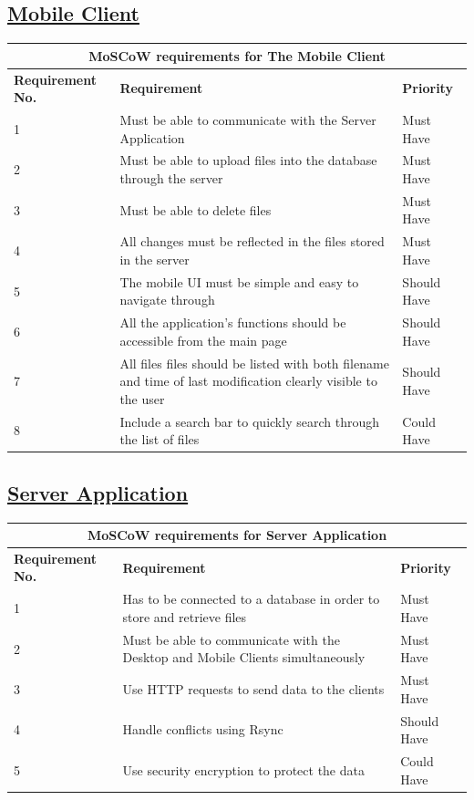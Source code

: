 \documentclass{article}
\begin{document}
\subsection{\underline{Mobile Client}}
\begin{tabular}{|p{3cm}|p{5cm}|p{4cm}|}
\hline
\multicolumn{3}{|c|}{\textbf{MoSCoW requirements for The Mobile Client}} \\
\hline
\textbf{Requirement No.} & \textbf{Requirement} & \textbf{Priority}\\
\hline
1 & Must be able to communicate with the Server Application & Must Have \\
\hline
2 & Must be able to upload files into the database through the server & Must Have \\
\hline
3 & Must be able to delete files & Must Have \\
\hline
4 & All changes must be reflected in the files stored in the server & Must Have \\
\hline
5 & The mobile UI must be simple and easy to navigate through & Should Have \\
\hline
6 & All the application's functions should be accessible from the main page & Should Have \\
\hline
7 & All files files should be listed with both filename and time of last modification clearly visible to the user & Should Have \\
\hline
8 & Include a search bar to quickly search through the list of files & Could Have \\
\hline
\end{tabular}

\subsection{\underline{Server Application}}

\begin{tabular}{|p{3cm}|p{5cm}|p{4cm}|}
\hline
\multicolumn{3}{|c|}{\textbf{MoSCoW requirements for Server Application}} \\
\hline
\textbf{Requirement No.} & \textbf{Requirement} & \textbf{Priority}\\
\hline
1 & Has to be connected to a database in order to store and retrieve files & Must Have \\
\hline
2 & Must be able to communicate with the Desktop and Mobile Clients simultaneously & Must Have \\
\hline
3 & Use HTTP requests to send data to the clients & Must Have \\
\hline
4 & Handle conflicts using Rsync & Should Have \\
\hline
5 & Use security encryption to protect the data & Could Have\\
\hline
\end{tabular}
\end{document}
